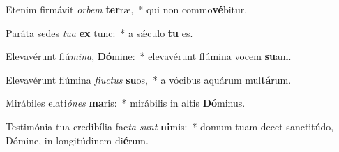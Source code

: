 \item Etenim firmávit \textit{or}\textit{bem} \textbf{ter}ræ,~* qui non commo\textbf{vé}bitur.
\item Paráta sedes \textit{tu}\textit{a} \textbf{ex} tunc:~* a sǽculo \textbf{tu} es.
\item Elevavérunt flú\textit{mi}\textit{na}, \textbf{Dó}mine:~* elevavérunt flúmina vocem \textbf{su}am.
\item Elevavérunt flúmina \textit{fluc}\textit{tus} \textbf{su}os,~* a vócibus aquárum mul\textbf{tá}rum.
\item Mirábiles elati\textit{ó}\textit{nes} \textbf{ma}ris:~* mirábilis in altis \textbf{Dó}minus.
\item Testimónia tua credibília fac\textit{ta} \textit{sunt} \textbf{ni}mis:~* domum tuam decet sanctitúdo, Dómine, in longitúdinem di\textbf{é}rum.
